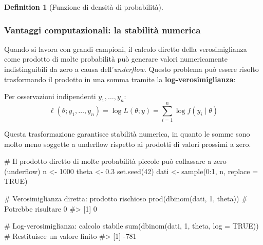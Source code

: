 \documentclass[
  letterpaper,
  DIV=11,
  numbers=noendperiod,
  oneside]{scrreprt}
\newenvironment{Shaded}{\begin{snugshade}}{\end{snugshade}}
\newcommand{\AttributeTok}[1]{\textcolor[rgb]{0.40,0.45,0.13}{#1}}
\newcommand{\CommentTok}[1]{\textcolor[rgb]{0.37,0.37,0.37}{#1}}
\newcommand{\ConstantTok}[1]{\textcolor[rgb]{0.56,0.35,0.01}{#1}}
\newcommand{\DecValTok}[1]{\textcolor[rgb]{0.68,0.00,0.00}{#1}}
\newcommand{\FloatTok}[1]{\textcolor[rgb]{0.68,0.00,0.00}{#1}}
\newcommand{\FunctionTok}[1]{\textcolor[rgb]{0.28,0.35,0.67}{#1}}
\newcommand{\NormalTok}[1]{\textcolor[rgb]{0.00,0.23,0.31}{#1}}
\newcommand{\OtherTok}[1]{\textcolor[rgb]{0.00,0.23,0.31}{#1}}
\newcommand{\SpecialCharTok}[1]{\textcolor[rgb]{0.37,0.37,0.37}{#1}}
\theoremstyle{definition}
\theoremstyle{plain}
\theoremstyle{definition}
\newtheorem{definition}{Definition}[chapter]
\theoremstyle{remark}
\begin{document}
\begin{definition}[Funzione di densità di
probabilità]
\subsubsection{Vantaggi computazionali: la stabilità
numerica}\label{vantaggi-computazionali-la-stabilituxe0-numerica}

Quando si lavora con grandi campioni, il calcolo diretto della
verosimiglianza come prodotto di molte probabilità può generare valori
numericamente indistinguibili da zero a causa dell'\emph{underflow}.
Questo problema può essere risolto trasformando il prodotto in una somma
tramite la \textbf{log-verosimiglianza}:

Per osservazioni indipendenti \(y_1, \ldots, y_n\): \[
\ell(\theta; y_1, \ldots, y_n) = \log L(\theta; y) = \sum_{i=1}^n \log f(y_i \mid \theta)
\]

Questa trasformazione garantisce stabilità numerica, in quanto le somme
sono molto meno soggette a underflow rispetto ai prodotti di valori
prossimi a zero.

\begin{tcolorbox}[enhanced jigsaw, arc=.35mm, breakable, colbacktitle=quarto-callout-caution-color!10!white, opacityback=0, toprule=.15mm, rightrule=.15mm, colback=white, opacitybacktitle=0.6, leftrule=.75mm, coltitle=black, bottomtitle=1mm, left=2mm, toptitle=1mm, title=\textcolor{quarto-callout-caution-color}{\faFire}\hspace{0.5em}{Esempio pratico: underflow vs.~stabilità}, titlerule=0mm, bottomrule=.15mm, colframe=quarto-callout-caution-color-frame]

\begin{Shaded}
\begin{Highlighting}[]
\CommentTok{\# Il prodotto diretto di molte probabilità piccole può collassare a zero (underflow)}
\NormalTok{n }\OtherTok{\textless{}{-}} \DecValTok{1000}
\NormalTok{theta }\OtherTok{\textless{}{-}} \FloatTok{0.3}
\FunctionTok{set.seed}\NormalTok{(}\DecValTok{42}\NormalTok{)}
\NormalTok{dati }\OtherTok{\textless{}{-}} \FunctionTok{sample}\NormalTok{(}\DecValTok{0}\SpecialCharTok{:}\DecValTok{1}\NormalTok{, n, }\AttributeTok{replace =} \ConstantTok{TRUE}\NormalTok{)}

\CommentTok{\# Verosimiglianza diretta: prodotto rischioso}
\FunctionTok{prod}\NormalTok{(}\FunctionTok{dbinom}\NormalTok{(dati, }\DecValTok{1}\NormalTok{, theta))  }\CommentTok{\# Potrebbe risultare 0}
\CommentTok{\#\textgreater{} [1] 0}

\CommentTok{\# Log{-}verosimiglianza: calcolo stabile}
\FunctionTok{sum}\NormalTok{(}\FunctionTok{dbinom}\NormalTok{(dati, }\DecValTok{1}\NormalTok{, theta, }\AttributeTok{log =} \ConstantTok{TRUE}\NormalTok{))  }\CommentTok{\# Restituisce un valore finito}
\CommentTok{\#\textgreater{} [1] {-}781}
\end{Highlighting}
\end{Shaded}


\end{tcolorbox}
\end{definition}
\end{document}
